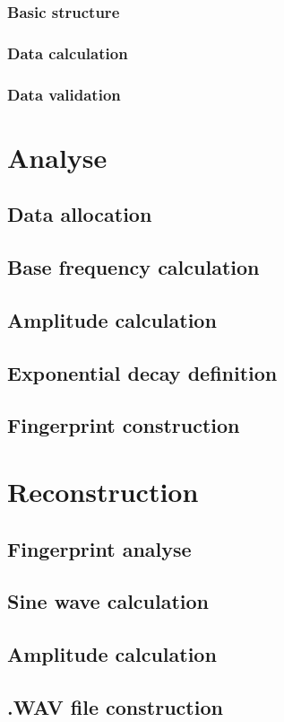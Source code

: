 \documentclass[a4paper,12pt]{report}
\begin{document}
	\subsection{Basic structure}
	\subsection{Data calculation}
	\subsection{Data validation}
	\chapter{Analyse}
	\section{Data allocation}
	\section{Base frequency calculation}
	\section{Amplitude calculation}
	\section{Exponential decay definition}
	\section{Fingerprint construction}
	\chapter{Reconstruction}
	\section{Fingerprint analyse}
	\section{Sine wave calculation}
	\section{Amplitude calculation}
	\section{.WAV file construction}
\end{document}
